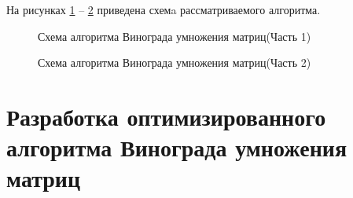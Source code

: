 На рисунках \ref{fig:vinograd} -- \ref{fig:vinograd2} приведена схемa рассматриваемого алгоритма.
\FloatBarrier
\begin{figure}[h]
	
	\caption{Схема алгоритма Винограда умножения матриц(Часть 1)}
	\label{fig:vinograd}
\end{figure}
\FloatBarrier

\FloatBarrier
\begin{figure}[h]
	\caption{Схема алгоритма Винограда умножения матриц(Часть 2)}
	
	\label{fig:vinograd2}
\end{figure}
\FloatBarrier
\clearpage

\section{Разработка оптимизированного алгоритма Винограда умножения матриц}

